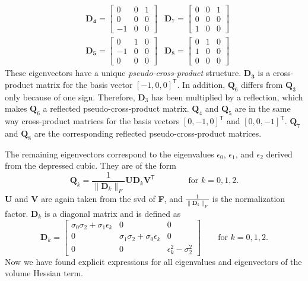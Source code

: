 {{{\begin{align*}
&\mathbf{D_4} = \left[ \begin{matrix}
0 & 0 & 1 \\ 0 & 0 & 0 \\ -1 & 0 & 0 \end{matrix} \right] &\mathbf{D}_7 = \left[ \begin{matrix}
0 & 0 & 1 \\ 0 & 0 & 0 \\ 1 & 0 & 0 \end{matrix} \right]
 \\[0.5em]
&\mathbf{D_5} = \left[ \begin{matrix}
0 & 1 & 0 \\ -1 & 0 & 0 \\ 0 & 0 & 0 \end{matrix} \right] &\mathbf{D}_8 = \left[ \begin{matrix}
0 & 1 & 0 \\ 1 & 0 & 0 \\ 0 & 0 & 0 \end{matrix} \right]
\end{align*}
These eigenvectors have a unique \textit{pseudo-cross-product} structure. $\mathbf{D_3}$ is a cross-product matrix for the basis vector $[-1, 0, 0]^\mathsf{T}$. In addition, $\mathbf{Q}_6$ differs from $\mathbf{Q}_3$ only because of one sign. Therefore, $\mathbf{D}_3$ has been multiplied by a reflection, which makes $\mathbf{Q}_6$ a reflected pseudo-cross-product matrix. $\mathbf{Q}_4$ and $\mathbf{Q}_5$ are in the same way cross-product matrices for the basis vectors $[0, -1, 0]^\mathsf{T}$ and $[0, 0, -1]^\mathsf{T}$. $\mathbf{Q}_7$ and $\mathbf{Q}_8$ are the corresponding reflected pseudo-cross-product matrices.

The remaining eigenvectors correspond to the eigenvalues $\epsilon_0$, $\epsilon_1$, and $\epsilon_2$ derived from the depressed cubic. They are of the form
\[
\mathbf{Q}_k = \frac{1}{\| \mathbf{D}_k \|_{F}} \mathbf{U} \mathbf{D}_k \mathbf{V}^\mathsf{T} \qquad \qquad \text{for } k = 0, 1, 2.
\]
\textbf{U} and \textbf{V} are again taken from the \acrshort{svd} of \textbf{F}, and $\frac{1}{\| \mathbf{D}_k \|_{F}}$ is the normalization factor. $\mathbf{D}_k$ is a diagonal matrix and is defined as
\[
\mathbf{D}_k = \left[ \begin{matrix}
\sigma_0 \sigma_2 + \sigma_1 \epsilon_k & 0 & 0 \\ 0 & \sigma_1 \sigma_2 + \sigma_0 \epsilon_k & 0 \\ 0 & 0 & \epsilon_k^2 - \sigma_2^2 \end{matrix} \right] \qquad \text{for } k = 0, 1, 2.
\]
Now we have found explicit expressions for all eigenvalues and eigenvectors of the volume Hessian term.

}}}
